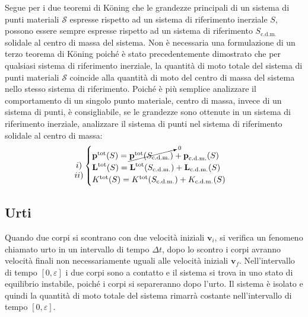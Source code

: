\documentclass{article}
\newcommand{\vect}[1]{\boldsymbol{\mathbf{#1}}}
\numberwithin{equation}{subsection}
\begin{document}
Segue per i due teoremi di K\"oning che le grandezze principali di un sistema di punti materiali $\mathscr{S}$ espresse rispetto ad 
un sistema di riferimento inerziale $S$, possono essere sempre espresse 
rispetto ad un sistema di riferimento $S_{\mathrm{c.d.m.}}$ solidale al centro di massa del sistema. Non è necessaria una formulazione di un terzo teorema di K\"oning poiché 
è stato precedentemente dimostrato che per qualsiasi sistema di riferimento inerziale, la quantità di moto totale del sistema di punti materiali $\mathscr{S}$ coincide 
alla quantità di moto del centro di massa del sistema nello stesso sistema di riferimento. Poiché è più semplice analizzare il comportamento di un singolo punto materiale, 
centro di massa, 
invece di un sistema di punti, è consigliabile, se le grandezze sono ottenute in un sistema di riferimento inerziale, analizzare il sistema di punti nel sistema di riferimento 
solidale al centro di massa: 
\begin{equation}
    \begin{matrix}
        \strut 
        \\
        \left.i\right) 
        \\
        \left.ii\right) 
    \end{matrix}
    \begin{cases}
        \vect{p}^\mathrm{tot}(S)=\cancelto{0}{\vect p^\mathrm{tot}(S_{\mathrm{c.d.m.}})}+\vect{p}_{\mathrm{c.d.m.}}(S)\\
        \vect{L}^\mathrm{tot}(S)=\vect{L}^\mathrm{tot}(S_{\mathrm{c.d.m.}})+\vect{L}_{\mathrm{c.d.m.}}(S)\\
        K^\mathrm{tot}(S)=K^\mathrm{tot}(S_{\mathrm{c.d.m.}})+K_{\mathrm{c.d.m.}}(S)
    \end{cases}
\end{equation}

\subsection{Urti}
Quando due corpi si scontrano con due velocità iniziali $\vect{v}_i$, 
si verifica un fenomeno 
chiamato urto in un intervallo di tempo $\Delta t$, dopo 
lo scontro i corpi avranno velocità finali non necessariamente 
uguali alle velocità iniziali $\vect{v}_f$. Nell'intervallo di tempo 
$[0,\varepsilon]$ i due corpi sono a contatto e il sistema si trova 
in uno stato di equilibrio instabile, poiché i corpi si 
separeranno dopo l'urto. Il sistema è isolato e quindi la 
quantità di moto totale del sistema rimarrà costante nell'intervallo 
di tempo $[0,\varepsilon]$. 
\end{document}
